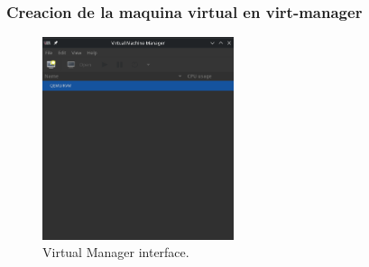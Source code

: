 \documentclass[a4paper,12pt]{article}
\begin{document}
\newpage

\subsubsection{Creacion de la maquina virtual en virt-manager}

\begin{figure}[h!]
    \centering
    \includegraphics[width=0.5\textwidth]{1.png}
    \caption{Virtual Manager interface.}
\end{figure}
\end{document}
